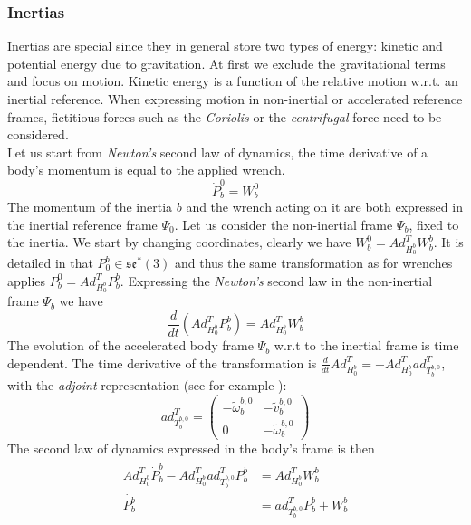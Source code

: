 \documentclass[a4paper,twoside, openright,12pt]{report}
\begin{document}
{\subsubsection{Inertias}
Inertias are special since they in general store two types of energy: kinetic and potential energy due to gravitation. At first we exclude the gravitational terms and focus on motion. Kinetic energy is a function of the relative motion w.r.t. an inertial reference. When expressing motion in non-inertial or accelerated reference frames, fictitious forces such as the \emph{Coriolis} or the \emph{centrifugal} force need to be considered.\\
Let us start from \emph{Newton's} second law of dynamics, the time derivative of a body's momentum is equal to the applied wrench.
\begin{equation}
\dot{P}_b^0 = W_b^0
\end{equation}
The momentum of the inertia $b$ and the wrench acting on it are both expressed in the inertial reference frame $\Psi_0$. Let us consider the non-inertial frame $\Psi_b$, fixed to the inertia. We start by changing coordinates, clearly we have $W_b^0 = Ad_{H_0^b}^T W_b^b$. It is detailed in \cite{Stramigioli_01} that $P_0^b \in \mathfrak{se}^*(3)$ and thus the same transformation as for wrenches applies $P_b^0 = Ad_{H_0^b}^T P_b^b$. Expressing the \emph{Newton's} second law in the non-inertial frame $\Psi_b$ we have
\begin{equation}
\frac{d}{dt}(Ad_{H_0^b}^T P_b^b) = Ad_{H_0^b}^T W_b^b
\end{equation}
The evolution of the accelerated body frame $\Psi_b$ w.r.t to the inertial frame is time dependent. The time derivative of the transformation is $\frac{d}{dt}Ad_{H_0^b}^T = -Ad_{H_0^b}^T ad_{T_b^{b,0}}^T $, with the \emph{adjoint} representation (see for example \cite{Stramigioli_01b}):
\begin{equation}\label{EQ:adjointmapping}
ad_{T_b^{b,0}}^T = \begin{pmatrix}
-\tilde{\omega}_b^{b,0} & -\tilde{v}_b^{b,0} \\ 0 & -\tilde{\omega}_b^{b,0}\end{pmatrix}
\end{equation}
The second law of dynamics expressed in the body's frame is then
\begin{eqnarray}
\begin{aligned}
Ad_{H_0^b}^T \dot{P}_b^b -Ad_{H_0^b}^T ad_{T_b^{b,0}}^T P_b^b &= Ad_{H_0^b}^T W_b^b \\
\dot{P_b^b} &= ad_{T_b^{b,0}}^T P_b^b + W_b^b

\end{aligned}
\end{eqnarray}}
\end{document}

